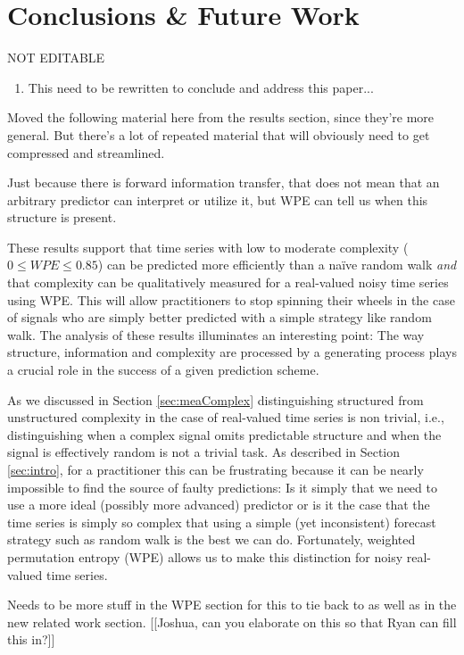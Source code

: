 \section{ Conclusions \& Future Work }\label{sec:conc}
{\color{red} NOT EDITABLE}
\begin{enumerate}
\item  This need to be rewritten to conclude and address this paper...
\end{enumerate}

Moved the following material here from the results section, since
they're more general.  But there's a lot of repeated material that
will obviously need to get compressed and streamlined.

Just because there is forward information transfer, that does not mean
that an arbitrary predictor can interpret or utilize it, but WPE can
tell us when this structure is present.

These results support that time series with low to moderate complexity
($0\le WPE \le 0.85$) can be predicted more efficiently than a na\"ive
random walk \emph{and} that complexity can be qualitatively measured
for a real-valued noisy time series using WPE. This will allow
practitioners to stop spinning their wheels in the case of signals who
are simply better predicted with a simple strategy like random
walk. The analysis of these results illuminates an interesting point:
The way structure, information and complexity are processed by a
generating process plays a crucial role in the success of a given
prediction scheme.

As we discussed in Section \ref{sec:meaComplex} distinguishing
structured from unstructured complexity in the case of real-valued
time series is non trivial, i.e., distinguishing when a complex signal
omits predictable structure and when the signal is effectively random
is not a trivial task. As described in Section \ref{sec:intro}, for a
practitioner this can be frustrating because it can be nearly
impossible to find the source of faulty predictions: Is it simply that
we need to use a more ideal (possibly more advanced) predictor or is
it the case that the time series is simply so complex that using a
simple (yet inconsistent) forecast strategy such as random walk is the
best we can do. Fortunately, weighted permutation entropy (WPE) allows
us to make this distinction for noisy real-valued time series.

Needs to be more stuff in the WPE section for this to tie back to as
well as in the new related work section.  [[Joshua, can you elaborate
    on this so that Ryan can fill this in?]]

